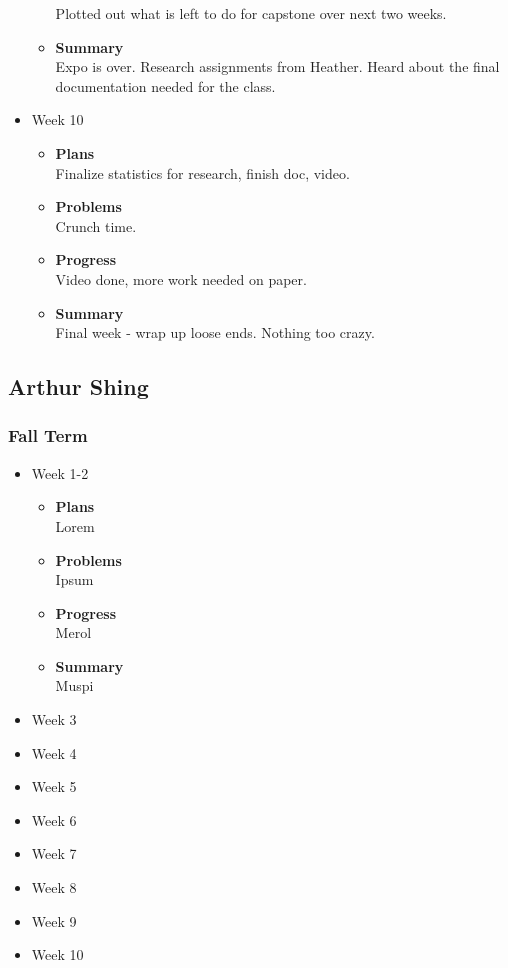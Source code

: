 \begin{itemize}
\begin{itemize}
				Plotted out what is left to do for capstone over next two weeks.
				\item \textbf{Summary} \\
				Expo is over. Research assignments from Heather. Heard about the final documentation needed for the class.
			\end{itemize}
		\item{Week 10}
			\begin{itemize}
				\item \textbf{Plans} \\
				Finalize statistics for research, finish doc, video.
				\item \textbf{Problems} \\
				Crunch time.
				\item \textbf{Progress} \\
				Video done, more work needed on paper.
				\item \textbf{Summary} \\
				Final week - wrap up loose ends. Nothing too crazy.
			\end{itemize}
	\end{itemize}

	\pagebreak


	\subsection{Arthur Shing}
	\subsubsection{Fall Term}
	\begin{itemize}
		\item{Week 1-2}
			\begin{itemize}
				\item \textbf{Plans} \\
				Lorem
				\item \textbf{Problems} \\
				Ipsum
				\item \textbf{Progress} \\
				Merol
				\item \textbf{Summary} \\
				Muspi
			\end{itemize}
		\item{Week 3}
		\item{Week 4}
		\item{Week 5}
		\item{Week 6}
		\item{Week 7}
		\item{Week 8}
		\item{Week 9}
		\item{Week 10}
	\end{itemize}
